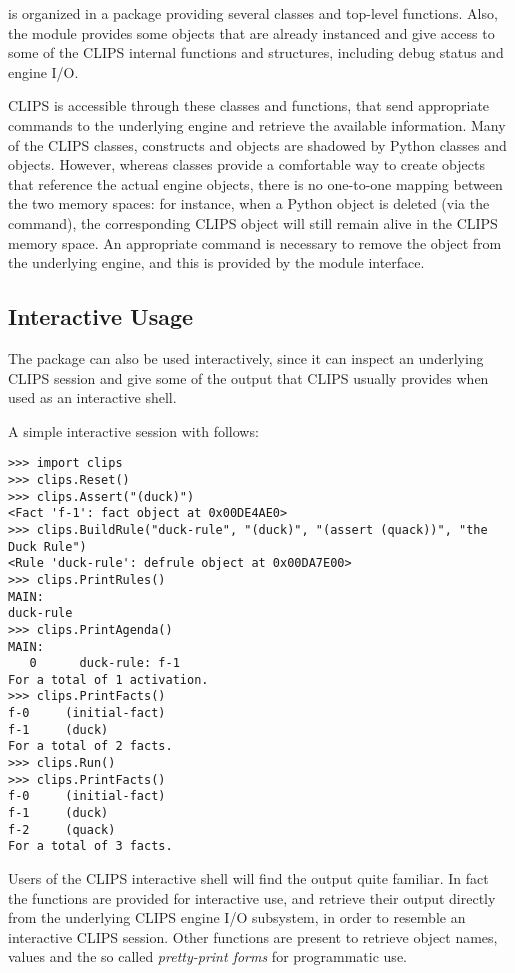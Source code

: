 \pyclips{} is organized in a package providing several classes and
top-level functions. Also, the module provides some objects that are
already instanced and give access to some of the CLIPS internal
functions and structures, including debug status and engine I/O.

CLIPS is accessible through these classes and functions, that send
appropriate commands to the underlying engine and retrieve the
available information. Many of the CLIPS classes, constructs and
objects are shadowed by Python classes and objects. However, whereas
\pyclips{} classes provide a comfortable way to create objects that
reference the actual engine objects, there is no one-to-one
mapping between the two memory spaces: for instance, when a Python
object is deleted (via the  command), the corresponding
CLIPS object will still remain alive in the CLIPS memory space. An
appropriate command is necessary to remove the object from the
underlying engine, and this is provided by the module interface.


\subsection{Interactive Usage\label{pyclips-ov-interactive}}

The \pyclips{} package can also be used interactively, since it can
inspect an underlying CLIPS session and give some of the output that
CLIPS usually provides when used as an interactive shell.

A simple interactive session with \pyclips{} follows:

\begin{verbatim}
>>> import clips
>>> clips.Reset()
>>> clips.Assert("(duck)")
<Fact 'f-1': fact object at 0x00DE4AE0>
>>> clips.BuildRule("duck-rule", "(duck)", "(assert (quack))", "the Duck Rule")
<Rule 'duck-rule': defrule object at 0x00DA7E00>
>>> clips.PrintRules()
MAIN:
duck-rule
>>> clips.PrintAgenda()
MAIN:
   0      duck-rule: f-1
For a total of 1 activation.
>>> clips.PrintFacts()
f-0     (initial-fact)
f-1     (duck)
For a total of 2 facts.
>>> clips.Run()
>>> clips.PrintFacts()
f-0     (initial-fact)
f-1     (duck)
f-2     (quack)
For a total of 3 facts.
\end{verbatim}

Users of the CLIPS interactive shell will find the \pyclips{} output
quite familiar. In fact the  functions
are provided for interactive use, and retrieve their output directly from
the underlying CLIPS engine I/O subsystem, in order to resemble an
interactive CLIPS session. Other functions are present to retrieve
object names, values and the so called \emph{pretty-print forms} for
programmatic use.


